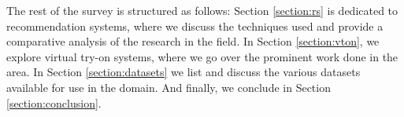 	The rest of the survey is structured as follows: Section \ref{section:rs} is dedicated to recommendation systems, where we discuss the techniques used and provide a comparative analysis of the research in the field. In Section \ref{section:vton}, we explore virtual try-on systems, where we go over the prominent work done in the area. In Section \ref{section:datasets} we list and discuss the various datasets available for use in the domain. And finally, we conclude in Section \ref{section:conclusion}.